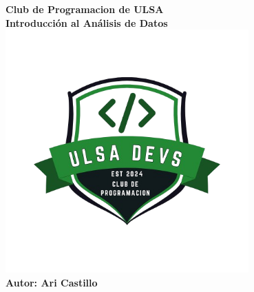 \documentclass{article}
\begin{document}
\begin{center}
    \Huge \textbf{Club de Programacion de ULSA} \\[1cm]
    \LARGE \textbf{Introducción al Análisis de Datos} \\[0.5cm]
    \includegraphics[width=0.7\textwidth]{imagenes/portada.png} \\[2cm]
    \large \textbf{Autor: Ari Castillo} \\[2cm]
\end{center}

\newpage
\end{document}
